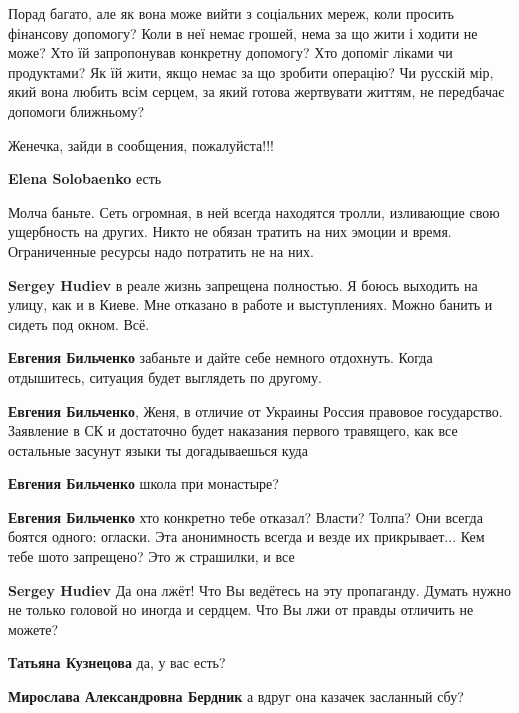 \begin{itemize}
\begin{itemize}
Порад багато, але як вона може вийти з соціальних мереж, коли просить фінансову
допомогу? Коли в неї немає грошей, нема за що жити і ходити не може? Хто їй
запропонував конкретну допомогу? Хто допоміг ліками чи продуктами? Як їй жити,
якщо немає за що зробити операцію? Чи русскій мір, який вона любить всім
серцем, за який готова жертвувати життям, не передбачає допомоги ближньому?

\end{itemize} %

Женечка, зайди в сообщения, пожалуйста!!!


\textbf{Elena Solobaenko} есть


Молча баньте. Сеть огромная, в ней всегда находятся тролли, изливающие свою
ущербность на других. Никто не обязан тратить на них эмоции и время.
Ограниченные ресурсы надо потратить не на них.

\begin{itemize} %
\textbf{Sergey Hudiev} в реале жизнь запрещена полностью. Я боюсь выходить на улицу, как и в Киеве. Мне отказано в работе и выступлениях. Можно банить и сидеть под окном. Всё.

\textbf{Евгения Бильченко} забаньте и дайте себе немного отдохнуть. Когда отдышитесь, ситуация будет выглядеть по другому.


\textbf{Евгения Бильченко}, Женя, в отличие от Украины Россия правовое государство. Заявление в СК и достаточно будет наказания первого травящего, как все остальные засунут языки ты догадываешься куда

\textbf{Евгения Бильченко} школа при монастыре?

\textbf{Евгения Бильченко} хто конкретно тебе отказал? Власти? Толпа? Они всегда боятся одного: огласки. Эта анонимность всегда и везде их прикрывает... Кем тебе шото запрещено? Это ж страшилки, и все

\textbf{Sergey Hudiev}
Да она лжёт!
Что Вы ведётесь на эту пропаганду.
Думать нужно не только головой но иногда и сердцем. Что Вы лжи от правды отличить не можете?


\textbf{Татьяна Кузнецова} да, у вас есть?

\textbf{Мирослава Александровна Бердник} а вдруг она казачек засланный сбу?


\end{itemize}
\end{itemize}
